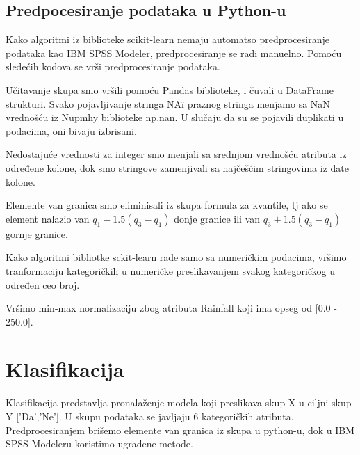 \documentclass[a4paper]{article}
\begin{document}
\subsection{Predpocesiranje podataka u Python-u}
\label{subsec:predprocess}
Kako algoritmi iz biblioteke scikit-learn\cite{scikit} nemaju automatso predprocesiranje podataka kao IBM SPSS Modeler, predprocesiranje se radi manuelno. Pomoću sledećih kodova se vrši predprocesiranje podataka. 

Učitavanje skupa smo vršili pomoću Pandas \cite{pandas} biblioteke, i čuvali u DataFrame strukturi. Svako pojavljivanje stringa \"NA\" i  praznog stringa  menjamo sa NaN vrednošću iz Nupmhy\cite{numpy} biblioteke np.nan. U slučaju da su se pojavili duplikati u podacima, oni bivaju izbrisani.\par



Nedostajuće vrednosti za integer smo menjali sa srednjom vrednošću atributa iz određene kolone, dok smo stringove zamenjivali sa najčešćim stringovima iz date kolone.\par


Elemente van granica smo eliminisali iz skupa formula za kvantile, tj ako se element nalazio van $q_1 - 1.5(q_3 - q_1)$ donje granice ili van $q_3 + 1.5(q_3 - q_1)$ gornje granice.


Kako algoritmi bibliotke sckit-learn rade samo sa numeričkim podacima, vršimo tranformaciju kategoričkih u numeričke preslikavanjem svakog kategoričkog u određen ceo broj.


Vršimo min-max normalizaciju zbog atributa Rainfall koji ima opseg od [0.0 - 250.0].


\section{Klasifikacija}
\label{sec:Klasifikacija}
Klasifikacija predstavlja pronalaženje modela koji preslikava skup X u ciljni skup Y ['Da','Ne']. U skupu podataka se javljaju 6 kategoričkih atributa. Predprocesiranjem brišemo elemente van granica iz skupa u python-u, dok u IBM SPSS Modeleru koristimo ugrađene metode.\par
\end{document}
